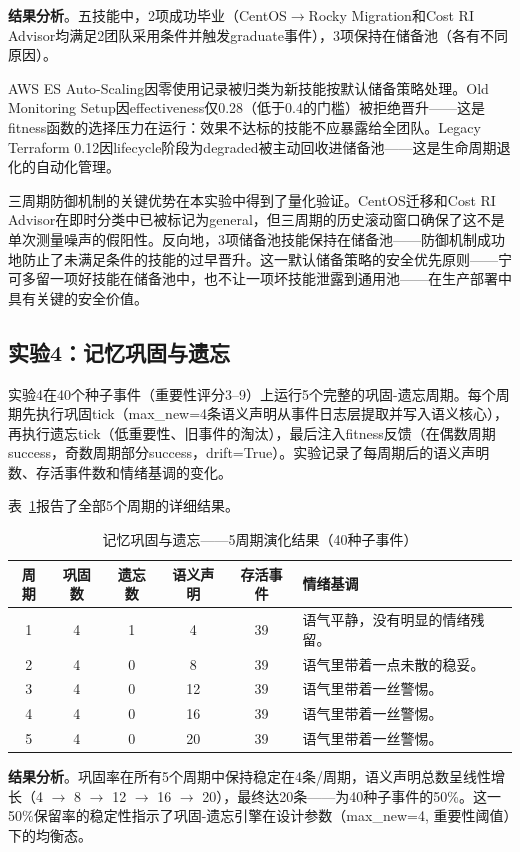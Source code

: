 \documentclass[12pt,a4paper]{ctexart}
\begin{document}
\textbf{结果分析}。五技能中，2项成功毕业（CentOS$\to$Rocky Migration和Cost RI Advisor均满足2团队采用条件并触发graduate事件），3项保持在储备池（各有不同原因）。

AWS ES Auto-Scaling因零使用记录被归类为新技能按默认储备策略处理。Old Monitoring Setup因effectiveness仅0.28（低于0.4的门槛）被拒绝晋升——这是fitness函数的选择压力在运行：效果不达标的技能不应暴露给全团队。Legacy Terraform 0.12因lifecycle阶段为degraded被主动回收进储备池——这是生命周期退化的自动化管理。

三周期防御机制的关键优势在本实验中得到了量化验证。CentOS迁移和Cost RI Advisor在即时分类中已被标记为general，但三周期的历史滚动窗口确保了这不是单次测量噪声的假阳性。反向地，3项储备池技能保持在储备池——防御机制成功地防止了未满足条件的技能的过早晋升。这一默认储备策略的安全优先原则——宁可多留一项好技能在储备池中，也不让一项坏技能泄露到通用池——在生产部署中具有关键的安全价值。

\subsection{实验4：记忆巩固与遗忘}

实验4在40个种子事件（重要性评分3--9）上运行5个完整的巩固-遗忘周期。每个周期先执行巩固tick（max\_new=4条语义声明从事件日志层提取并写入语义核心），再执行遗忘tick（低重要性、旧事件的淘汰），最后注入fitness反馈（在偶数周期success，奇数周期部分success，drift=True）。实验记录了每周期后的语义声明数、存活事件数和情绪基调的变化。

表~\ref{tab:memory}报告了全部5个周期的详细结果。

\begin{table}[H]
\centering
\caption{记忆巩固与遗忘——5周期演化结果（40种子事件）}
\label{tab:memory}
\renewcommand{\arraystretch}{1.15}
\begin{tabular}{cccccl}
\toprule
周期 & 巩固数 & 遗忘数 & 语义声明 & 存活事件 & 情绪基调 \\
\midrule
1 & 4 & 1 & 4 & 39 & 语气平静，没有明显的情绪残留。\\
2 & 4 & 0 & 8 & 39 & 语气里带着一点未散的稳妥。\\
3 & 4 & 0 & 12 & 39 & 语气里带着一丝警惕。\\
4 & 4 & 0 & 16 & 39 & 语气里带着一丝警惕。\\
5 & 4 & 0 & 20 & 39 & 语气里带着一丝警惕。\\
\bottomrule
\end{tabular}
\end{table}

\textbf{结果分析}。巩固率在所有5个周期中保持稳定在4条/周期，语义声明总数呈线性增长（4 $\to$ 8 $\to$ 12 $\to$ 16 $\to$ 20），最终达20条——为40种子事件的50\%。这一50\%保留率的稳定性指示了巩固-遗忘引擎在设计参数（max\_new=4, 重要性阈值）下的均衡态。
\end{document}
